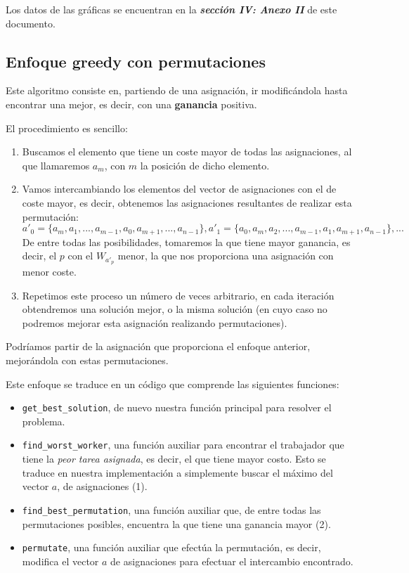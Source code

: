 \documentclass[10pt, a4paper]{article}
\theoremstyle{theorem-style}
\theoremstyle{theorem-style}
\theoremstyle{definition-style}
\theoremstyle{remark-style}
\theoremstyle{example-style}
\theoremstyle{definition-style}
\theoremstyle{remark-style}
\begin{document}
Los datos de las gráficas se encuentran en la \textbf{\emph{sección IV: Anexo II}} de este documento.

\subsection{Enfoque greedy con permutaciones}

Este algoritmo consiste en, partiendo de una asignación, ir modificándola hasta encontrar una mejor, es decir, con una \textbf{ganancia} positiva.

El procedimiento es sencillo:

\begin{enumerate}
	\item Buscamos el elemento que tiene un coste mayor de todas las asignaciones, al que llamaremos $a_m$, con $m$ la posición de dicho elemento.
	\item Vamos intercambiando los elementos del vector de asignaciones con el de coste mayor, es decir, obtenemos las asignaciones resultantes de realizar esta permutación: $$a'_0=\{a_m, a_1, ..., a_{m-1}, a_0, a_{m+1}, ..., a_{n-1}\}, a'_1 = \{a_0, a_m, a_2, ..., a_{m-1}, a_1, a_{m+1}, a_{n-1}\}, ...$$De entre todas las posibilidades, tomaremos la que tiene mayor ganancia, es decir, el $p$ con el $W_{a'_p}$ menor, la que nos proporciona una asignación con menor coste.
	\item Repetimos este proceso un número de veces arbitrario, en cada iteración obtendremos una solución mejor, o la misma solución (en cuyo caso no podremos mejorar esta asignación realizando permutaciones).
\end{enumerate}

Podríamos partir de la asignación que proporciona el enfoque anterior, mejorándola con estas permutaciones.

Este enfoque se traduce en un código que comprende las siguientes funciones:

\begin{itemize}
	\item \texttt{get\_best\_solution}, de nuevo nuestra función principal para resolver el problema.
	\item \texttt{find\_worst\_worker}, una función auxiliar para encontrar el trabajador que tiene la \emph{peor tarea asignada}, es decir, el que tiene mayor costo. Esto se traduce en nuestra implementación a simplemente buscar el máximo del vector $a$, de asignaciones (1).
	\item \texttt{find\_best\_permutation}, una función auxiliar que, de entre todas las permutaciones posibles, encuentra la que tiene una ganancia mayor (2).
	\item \texttt{permutate}, una función auxiliar que efectúa la permutación, es decir, modifica el vector $a$ de asignaciones para efectuar el intercambio encontrado.
\end{itemize}
\end{document}
